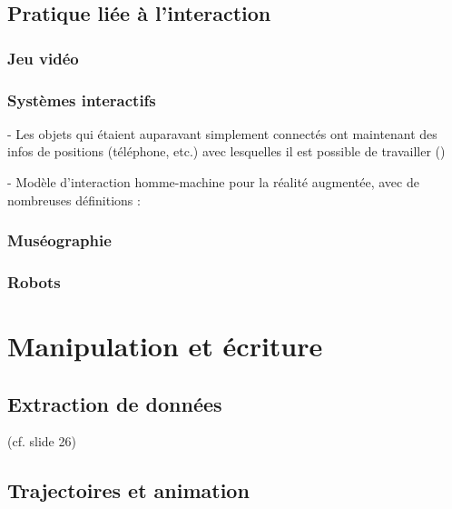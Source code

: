 \documentclass[french,12pt]{article}
\begin{document}
\subsection{Pratique liée à l'interaction}

\subsubsection{Jeu vidéo}
\cite{le_prado_ecriture_2013}
\cite{salazar_modelisation_2004}

\subsubsection{Systèmes interactifs}

- Les objets qui étaient auparavant simplement connectés ont maintenant des infos de positions (téléphone, etc.) avec lesquelles il est possible de travailler (\cite{beal_spacetime_2015})

- Modèle d'interaction homme-machine pour la réalité augmentée, avec de nombreuses définitions : \cite{chalon_realite_2004}

\cite{jankowski_advances_2015}
\cite{shen_blowbrush:_2014}
\cite{gustafson_imaginary_2010}
\subsubsection{Muséographie}
\cite{adhitya_composing_2012}
\cite{michael_comparative_2010}
\cite{azough_modeet_2014}
\cite{kidd_multi-touch_2011}
\subsubsection{Robots}
\cite{lee_virtual_2014} %

\section{Manipulation et écriture}

\subsection{Extraction de données}
\cite{li_aesthetic_2009} (cf. slide 26)
\subsection{Trajectoires et animation}
\cite{santosa_direct_2013}
\cite{kazi_kitty:_2014,scott_physink:_2013}
\end{document}
